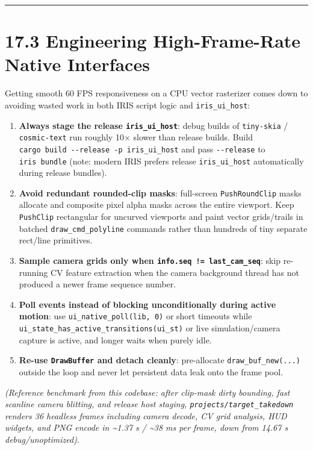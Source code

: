 \documentclass[
  english,
  oneside]{book}
\providecommand{\tightlist}{%
  \setlength{\itemsep}{0pt}\setlength{\parskip}{0pt}}
\begin{document}
\begin{center}\rule{0.5\linewidth}{0.5pt}\end{center}

\section{17.3 Engineering High-Frame-Rate Native
Interfaces}\label{engineering-high-frame-rate-native-interfaces}

Getting smooth 60 FPS responsiveness on a CPU vector rasterizer comes
down to avoiding wasted work in both IRIS script logic and
\texttt{iris\_ui\_host}:

\begin{enumerate}
\def\labelenumi{\arabic{enumi}.}
\tightlist
\item
  \textbf{Always stage the release \texttt{iris\_ui\_host}}: debug
  builds of \texttt{tiny-skia} / \texttt{cosmic-text} run roughly 10×
  slower than release builds. Build
  \texttt{cargo\ build\ -\/-release\ -p\ iris\_ui\_host} and pass
  \texttt{-\/-release} to \texttt{iris\ bundle} (note: modern IRIS
  prefers release \texttt{iris\_ui\_host} automatically during release
  bundles).
\item
  \textbf{Avoid redundant rounded-clip masks}: full-screen
  \texttt{PushRoundClip} masks allocate and composite pixel alpha masks
  across the entire viewport. Keep \texttt{PushClip} rectangular for
  uncurved viewports and paint vector grids/trails in batched
  \texttt{draw\_cmd\_polyline} commands rather than hundreds of tiny
  separate rect/line primitives.
\item
  \textbf{Sample camera grids only when
  \texttt{info.seq\ !=\ last\_cam\_seq}}: skip re-running CV feature
  extraction when the camera background thread has not produced a newer
  frame sequence number.
\item
  \textbf{Poll events instead of blocking unconditionally during active
  motion}: use \texttt{ui\_native\_poll(lib,\ 0)} or short timeouts
  while \texttt{ui\_state\_has\_active\_transitions(ui\_st)} or live
  simulation/camera capture is active, and longer waits when purely
  idle.
\item
  \textbf{Re-use \texttt{DrawBuffer} and detach cleanly}: pre-allocate
  \texttt{draw\_buf\_new(...)} outside the loop and never let persistent
  data leak onto the frame pool.
\end{enumerate}

\emph{(Reference benchmark from this codebase: after clip-mask dirty
bounding, fast scanline camera blitting, and release host staging,
\texttt{projects/target\_takedown} renders 36 headless frames including
camera decode, CV grid analysis, HUD widgets, and PNG encode in
\textasciitilde1.37 s / \textasciitilde38 ms per frame, down from 14.67
s debug/unoptimized).}
\end{document}

